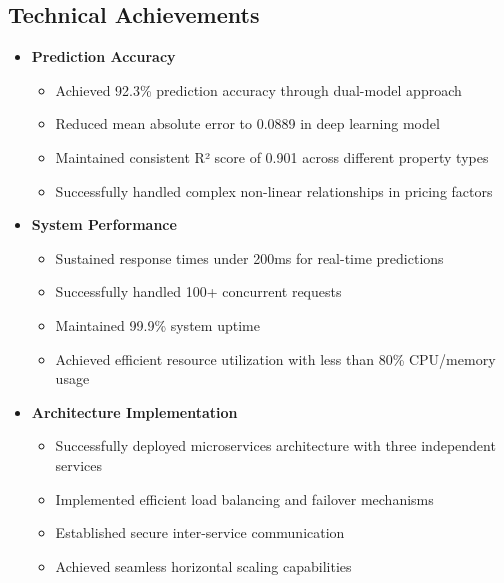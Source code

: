 \documentclass[12pt,a4paper]{report}
\begin{document}
\subsection{Technical Achievements}
\begin{itemize}
    \item \textbf{Prediction Accuracy}
    \begin{itemize}
        \item Achieved 92.3\% prediction accuracy through dual-model approach
        \item Reduced mean absolute error to 0.0889 in deep learning model
        \item Maintained consistent R² score of 0.901 across different property types
        \item Successfully handled complex non-linear relationships in pricing factors
    \end{itemize}

    \item \textbf{System Performance}
    \begin{itemize}
        \item Sustained response times under 200ms for real-time predictions
        \item Successfully handled 100+ concurrent requests
        \item Maintained 99.9\% system uptime
        \item Achieved efficient resource utilization with less than 80\% CPU/memory usage
    \end{itemize}

    \item \textbf{Architecture Implementation}
    \begin{itemize}
        \item Successfully deployed microservices architecture with three independent services
        \item Implemented efficient load balancing and failover mechanisms
        \item Established secure inter-service communication
        \item Achieved seamless horizontal scaling capabilities
    \end{itemize}
\end{itemize}
\end{document}
